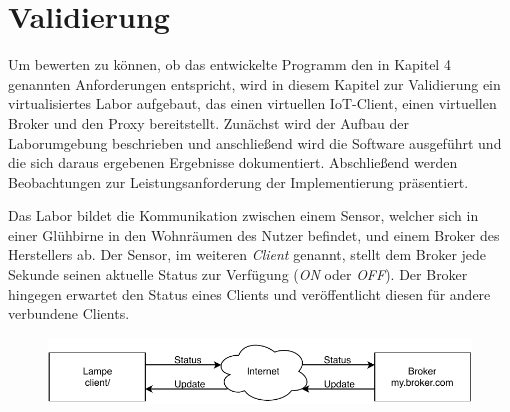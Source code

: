 \chapter{Validierung}
    
Um bewerten zu können, ob das entwickelte Programm den in Kapitel 4 genannten Anforderungen entspricht, wird in diesem Kapitel zur Validierung ein virtualisiertes Labor aufgebaut, das einen virtuellen \ac{IoT}-Client, einen virtuellen Broker und den Proxy bereitstellt.
Zunächst wird der Aufbau der Laborumgebung beschrieben und anschließend wird die Software ausgeführt und die sich daraus ergebenen Ergebnisse dokumentiert. Abschließend werden Beobachtungen zur Leistungsanforderung der Implementierung präsentiert.

Das Labor bildet die Kommunikation zwischen einem Sensor, welcher sich in einer Glühbirne in den Wohnräumen des Nutzer befindet, und einem Broker des Herstellers ab. Der Sensor, im weiteren \emph{Client} genannt, stellt dem Broker jede Sekunde seinen aktuelle Status zur Verfügung (\emph{ON} oder \emph{OFF}). Der Broker hingegen erwartet den Status eines Clients und veröffentlicht diesen für andere verbundene Clients.

\begin{figure}[h]%
    \centering
    \includegraphics[width=14cm]{tex/bilder/6_validierung/Szenario.pdf}
    \label{fig:darstellung-szenario}
\end{figure}

